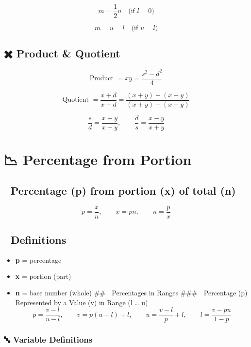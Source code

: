 \documentclass[
  letterpaper,
]{book}
\providecommand{\tightlist}{%
  \setlength{\itemsep}{0pt}\setlength{\parskip}{0pt}}
\begin{document}
\[
m = \frac{1}{2} u \quad \text{(if } l = 0\text{)}
\]

\[
m = u = l \quad \text{(if } u = l\text{)}
\]

\subsection{✖️ Product \& Quotient}\label{product-quotient}

\[
\text{Product } = xy = \frac{s^2 - d^2}{4}
\]

\[
\text{Quotient } = \frac{x + d}{x - d} = \frac{(x + y) + (x - y)}{(x + y) - (x - y)}
\]

\[
\frac{s}{d} = \frac{x + y}{x - y}, \qquad \frac{d}{s} = \frac{x - y}{x + y}
\]

\section{📉 Percentage from Portion}\label{percentage-from-portion}

\subsection{🔢 Percentage (p) from portion (x) of total
(n)}\label{percentage-p-from-portion-x-of-total-n}

\[
p = \frac{x}{n}, \qquad x = pn, \qquad n = \frac{p}{x}
\]

\subsection{📘 Definitions}\label{definitions-1}

\begin{itemize}
\tightlist
\item
  \textbf{p} = percentage\\
\item
  \textbf{x} = portion (part)\\
\item
  \textbf{n} = base number (whole) \#\# 🎯 Percentages in Ranges \#\#\#
  📐 Percentage (p) Represented by a Value (v) in Range (l \ldots{} u)
  \[
  p = \frac{v - l}{u - l}, \qquad v = p(u - l) + l, \qquad u = \frac{v - l}{p} + l, \qquad l = \frac{v - pu}{1 - p}
  \]
\end{itemize}

\subsubsection{🔤 Variable Definitions}\label{variable-definitions-1}
\end{document}

